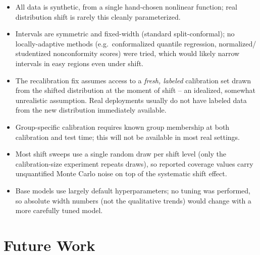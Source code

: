 \documentclass[11pt]{article}
\begin{document}
\begin{itemize}
  \item All data is synthetic, from a single hand-chosen nonlinear function; real
    distribution shift is rarely this cleanly parameterized.
  \item Intervals are symmetric and fixed-width (standard split-conformal); no
    locally-adaptive methods (e.g.\ conformalized quantile regression, normalized/
    studentized nonconformity scores) were tried, which would likely narrow
    intervals in easy regions even under shift.
  \item The recalibration fix assumes access to a \emph{fresh, labeled} calibration
    set drawn from the shifted distribution at the moment of shift -- an idealized,
    somewhat unrealistic assumption. Real deployments usually do not have labeled
    data from the new distribution immediately available.
  \item Group-specific calibration requires known group membership at both
    calibration and test time; this will not be available in most real settings.
  \item Most shift sweeps use a single random draw per shift level (only the
    calibration-size experiment repeats draws), so reported coverage values carry
    unquantified Monte Carlo noise on top of the systematic shift effect.
  \item Base models use largely default hyperparameters; no tuning was performed,
    so absolute width numbers (not the qualitative trends) would change with a more
    carefully tuned model.
\end{itemize}

\section{Future Work}
\end{document}
